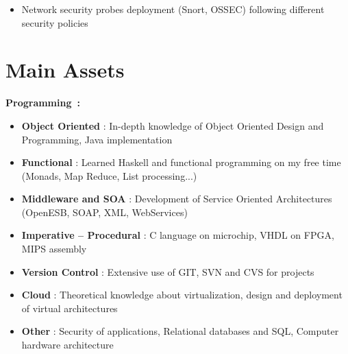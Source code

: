 \documentclass[]{friggeri-cv} %
\begin{document}
\begin{entrylist}
{\begin{itemize}
\item Network security probes deployment (Snort, OSSEC) following different security policies
\end{itemize}}


\end{entrylist}


\section{Main Assets}

\textbf{\large Programming~:} 
\vspace{-2mm}
\begin{itemize}[noitemsep,nolistsep]
\item \textbf{Object Oriented} : In-depth knowledge of Object Oriented Design and Programming, Java implementation
\item \textbf{Functional} : Learned Haskell and functional programming on my free time (Monads, Map Reduce, List processing...)
\item \textbf{Middleware and SOA} : Development of Service Oriented Architectures (OpenESB, SOAP, XML, WebServices)
\item \textbf{Imperative -- Procedural} : C language on microchip, VHDL on FPGA, MIPS assembly
\item \textbf{Version Control} : Extensive use of GIT, SVN and CVS for projects
\item \textbf{Cloud} : Theoretical knowledge about virtualization, design and deployment of virtual architectures
\item \textbf{Other} : Security of applications, Relational databases and SQL, Computer hardware architecture
\end{itemize}
\end{document}
